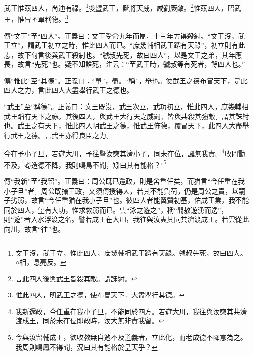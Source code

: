 武王惟茲四人，尚迪有祿。\footnote{文王沒，武王立，惟此四人，庶幾輔相武王蹈有天祿。虢叔先死，故曰四人。○相，息亮反。}後暨武王，誕將天威，咸劉厥敵。\footnote{言此四人後與武王皆殺其敵。謂誅紂。}惟茲四人，昭武王，惟冒丕單稱德。\footnote{惟此四人，明武王之德，使布冒天下，大盡舉行其德。}


{\noindent\zhuan{}\fzbyks 傳“文王”至“四人”。正義曰：文王受命九年而崩，十三年方得殺紂。“文王沒，武王立”，謂武王初立之時，惟此四人而已。“庶幾輔相武王蹈有天祿”，初立則有此志，故下句言後與武王殺紂也。“虢叔先死，故曰四人”，以是文王之弟，其年應長，故言“先死”也。疑不知誰死，注云：“至武王時，虢叔等有死者，餘四人也。” \par}

{\noindent\zhuan{}\fzbyks 傳“惟此”至“其德”。正義曰：“單”，盡。“稱”，舉也。使武王之德布冒天下，是此四人之力，言此四人大盡舉行武王之德也。 \par}

{\noindent\shu{}\fzkt “武王”至“稱德”。正義曰：文王既沒，武王次立，武功初立，惟此四人，庶幾輔相武王蹈有天下之祿。其後四人，與武王大行天之威罰，皆與共殺其強敵，謂其誅紂也。武王之有天下，惟此四人明武王之德，惟武王佈德，覆冒天下，此四人大盡舉行武王之德。言武王亦得良臣之力。 \par}

今在予小子旦，若遊大川，予往暨汝奭其濟小子，同未在位，誕無我責。\footnote{我新還政，今任重在我小子旦，不能同於四方。若遊大川，我往與汝奭其共濟渡成王，同於未在位即政時，汝大無非責我留。}收罔勖不及，耇造德不降，我則鳴鳥不聞，矧曰其有能格？”\footnote{今與汝留輔成王，欲收教無自勉不及道義者，立此化，而老成德不降意為之。我周則鳴鳳不得聞，況曰其有能格於皇天乎？}


{\noindent\zhuan{}\fzbyks 傳“我新”至“我留”。正義曰：周公既已還政，則是舍重任矣。而猶言“今任重在我小子旦”者，周公既攝王政，又須傳授得人，若其不能負荷，仍是周公之責，以嗣子劣弱，故言“今任重猶在我小子旦”也。彼四人者能翼贊初基，佑成王業，我不能同於四人，望有大功，惟求救弱而已。雲“泳之遊之”，稱“閻敖遊湧而逸”，則“遊”者入水浮渡之名。譬若成王在大川，我往與汝奭其同共濟渡成王。若雲從此向川，故言“往”也。 \par}

